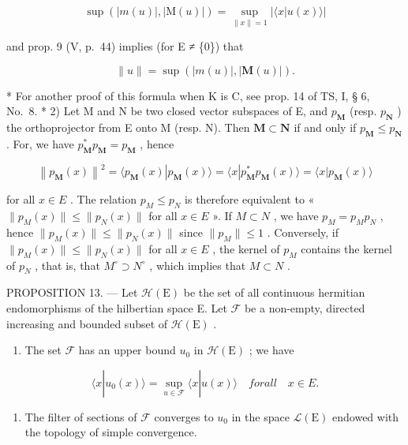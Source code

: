 \[
\sup \left(| m (u) |, | \mathrm{M} (u) |\right) = \sup _ {\| x \| = 1} \left| \langle x | u (x) \rangle \right|
\]

and prop. 9 (V, p.~44) implies (for E ≠ \{0\}) that

\[
\| u \| = \sup \left(| m (u) |, | \mathbf {M} (u) |\right).\tag{17}
\]

* For another proof of this formula when K is C, see prop. 14 of TS, I, § 6, No.~8. * 2) Let M and N be two closed vector subspaces of E, and \(p_{\mathbf{M}}\) (resp. \(p_{\mathbf{N}}\) ) the orthoprojector from E onto M (resp. N). Then \(\mathbf{M} \subset \mathbf{N}\) if and only if \(p_{\mathbf{M}} \leqslant p_{\mathbf{N}}\) . For, we have \(p_{\mathbf{M}}^{*}p_{\mathbf{M}} = p_{\mathbf{M}}\) , hence

\[
\left\| p _ {\mathbf {M}} (x) \right\| ^ {2} = \langle p _ {\mathbf {M}} (x) | p _ {\mathbf {M}} (x) \rangle = \langle x | p _ {\mathbf {M}} ^ {*} p _ {\mathbf {M}} (x) \rangle = \langle x | p _ {\mathbf {M}} (x) \rangle
\]

for all \(x \in E\) . The relation \(p_{M} \leqslant p_{N}\) is therefore equivalent to « \(\|p_{M}(x)\| \leqslant \|p_{N}(x)\|\) for all \(x \in E\) ». If \(M \subset N\) , we have \(p_{M} = p_{M} p_{N}\) , hence \(\|p_{M}(x)\| \leqslant \|p_{N}(x)\|\) since \(\|p_{M}\| \leqslant 1\) . Conversely, if \(\|p_{M}(x)\| \leqslant \|p_{N}(x)\|\) for all \(x \in E\) , the kernel of \(p_{M}\) contains the kernel of \(p_{N}\) , that is, that \(M^{\circ} \supset N^{\circ}\) , which implies that \(M \subset N\) .

PROPOSITION 13. --- Let \(\mathcal{H}(\mathrm{E})\) be the set of all continuous hermitian endomorphisms of the hilbertian space E. Let \(\mathcal{F}\) be a non-empty, directed increasing and bounded subset of \(\mathcal{H}(\mathrm{E})\) .

\begin{enumerate}
\def\labelenumi{(\roman{enumi})}
\tightlist
\item
  The set \(\mathcal{F}\) has an upper bound \(u_0\) in \(\mathcal{H}(\mathrm{E})\) ; we have
\end{enumerate}

\[
\langle x | u _ {0} (x) \rangle = \sup _ {u \in \mathcal {F}} \langle x | u (x) \rangle \quad f o r a l l \quad x \in E.\tag{18}
\]

\begin{enumerate}
\def\labelenumi{(\roman{enumi})}
\setcounter{enumi}{1}
\tightlist
\item
  The filter of sections of \(\mathcal{F}\) converges to \(u_0\) in the space \(\mathcal{L}(\mathrm{E})\) endowed with the topology of simple convergence.
\end{enumerate}

